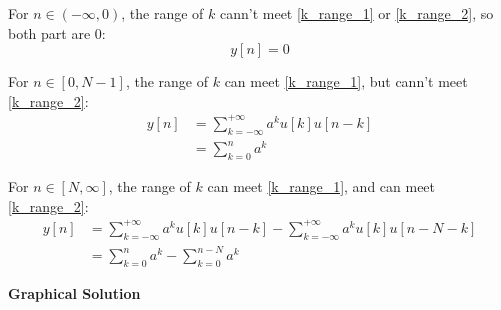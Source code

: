     For $n \in (-\infty,0)$, the range of $k$ cann't meet \eqref{k_range_1} or \eqref{k_range_2}, so both part are 0:
        \begin{equation}
            y[n] = 0
        \end{equation}
    
    For $n \in [0,N-1]$, the range of $k$ can meet \eqref{k_range_1}, but cann't meet \eqref{k_range_2}:
        \begin{equation}
            \begin{aligned}
            y[n] &= \sum_{k=-\infty}^{+\infty} a^ku[k]u[n-k]\\
                 &= \sum_{k=0}^{n}a^k
            \end{aligned}
        \end{equation}
    
    For $n \in [N,\infty]$, the range of $k$ can meet \eqref{k_range_1}, and can meet \eqref{k_range_2}:
        \begin{equation}
            \begin{aligned}
            y[n] &= \sum_{k=-\infty}^{+\infty} a^ku[k]u[n-k] -\sum_{k=-\infty}^{+\infty} a^ku[k]u[n-N-k] \\
                 &= \sum_{k=0}^{n}a^k - \sum_{k=0}^{n-N}a^k
            \end{aligned}
        \end{equation}
    
    \newpage
    \noindent \textbf{Graphical Solution}
    

